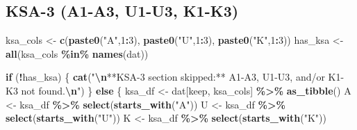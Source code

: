 \documentclass[
  10pt,
]{article}
\newenvironment{Shaded}{\begin{snugshade}}{\end{snugshade}}
\newcommand{\ControlFlowTok}[1]{\textcolor[rgb]{0.13,0.29,0.53}{\textbf{#1}}}
\newcommand{\DecValTok}[1]{\textcolor[rgb]{0.00,0.00,0.81}{#1}}
\newcommand{\FunctionTok}[1]{\textcolor[rgb]{0.13,0.29,0.53}{\textbf{#1}}}
\newcommand{\NormalTok}[1]{#1}
\newcommand{\OtherTok}[1]{\textcolor[rgb]{0.56,0.35,0.01}{#1}}
\newcommand{\SpecialCharTok}[1]{\textcolor[rgb]{0.81,0.36,0.00}{\textbf{#1}}}
\newcommand{\StringTok}[1]{\textcolor[rgb]{0.31,0.60,0.02}{#1}}
\begin{document}
\hypertarget{ksa-3-a1-a3-u1-u3-k1-k3}{%
\subsection{KSA-3 (A1-A3, U1-U3, K1-K3)}\label{ksa-3-a1-a3-u1-u3-k1-k3}}

\begin{Shaded}
\begin{Highlighting}[]
\NormalTok{ksa\_cols }\OtherTok{\textless{}{-}} \FunctionTok{c}\NormalTok{(}\FunctionTok{paste0}\NormalTok{(}\StringTok{"A"}\NormalTok{,}\DecValTok{1}\SpecialCharTok{:}\DecValTok{3}\NormalTok{), }\FunctionTok{paste0}\NormalTok{(}\StringTok{"U"}\NormalTok{,}\DecValTok{1}\SpecialCharTok{:}\DecValTok{3}\NormalTok{), }\FunctionTok{paste0}\NormalTok{(}\StringTok{"K"}\NormalTok{,}\DecValTok{1}\SpecialCharTok{:}\DecValTok{3}\NormalTok{))}
\NormalTok{has\_ksa  }\OtherTok{\textless{}{-}} \FunctionTok{all}\NormalTok{(ksa\_cols }\SpecialCharTok{\%in\%} \FunctionTok{names}\NormalTok{(dat))}

\ControlFlowTok{if}\NormalTok{ (}\SpecialCharTok{!}\NormalTok{has\_ksa) \{}
  \FunctionTok{cat}\NormalTok{(}\StringTok{"}\SpecialCharTok{\textbackslash{}n}\StringTok{**KSA{-}3 section skipped:** A1{-}A3, U1{-}U3, and/or K1{-}K3 not found.}\SpecialCharTok{\textbackslash{}n}\StringTok{"}\NormalTok{)}
\NormalTok{\} }\ControlFlowTok{else}\NormalTok{ \{}
\NormalTok{  ksa\_df }\OtherTok{\textless{}{-}}\NormalTok{ dat[keep, ksa\_cols] }\SpecialCharTok{\%\textgreater{}\%} \FunctionTok{as\_tibble}\NormalTok{()}
\NormalTok{  A }\OtherTok{\textless{}{-}}\NormalTok{ ksa\_df }\SpecialCharTok{\%\textgreater{}\%} \FunctionTok{select}\NormalTok{(}\FunctionTok{starts\_with}\NormalTok{(}\StringTok{"A"}\NormalTok{))}
\NormalTok{  U }\OtherTok{\textless{}{-}}\NormalTok{ ksa\_df }\SpecialCharTok{\%\textgreater{}\%} \FunctionTok{select}\NormalTok{(}\FunctionTok{starts\_with}\NormalTok{(}\StringTok{"U"}\NormalTok{))}
\NormalTok{  K }\OtherTok{\textless{}{-}}\NormalTok{ ksa\_df }\SpecialCharTok{\%\textgreater{}\%} \FunctionTok{select}\NormalTok{(}\FunctionTok{starts\_with}\NormalTok{(}\StringTok{"K"}\NormalTok{))}


\end{Highlighting}
\end{Shaded}
\end{document}
